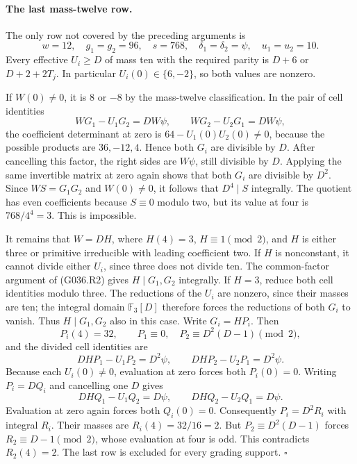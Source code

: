 \paragraph{The last mass-twelve row.}
The only row not covered by the preceding arguments is
\[
 w=12,\quad g_1=g_2=96,\quad s=768,\quad
 \delta_1=\delta_2=\psi,\quad u_1=u_2=10.
\]
Every effective $U_i\ge D$ of mass ten with the required
parity is $D+6$ or $D+2+2T_j$. In particular
$U_i(0)\in\{6,-2\}$, so both values are nonzero.

If $W(0)\ne0$, it is $8$ or $-8$ by the mass-twelve
classification. In the pair of cell identities
\[
 WG_1-U_1G_2=DW\psi,\qquad
 WG_2-U_2G_1=DW\psi,
\]
the coefficient determinant at zero is
$64-U_1(0)U_2(0)\ne0$, because the possible products
are $36,-12,4$. Hence both $G_i$ are divisible by $D$.
After cancelling this factor, the right sides are
$W\psi$, still divisible by $D$.
Applying the same invertible matrix at zero again
shows that both $G_i$ are divisible by $D^2$.
Since $WS=G_1G_2$ and $W(0)\ne0$, it follows that
$D^4\mid S$ integrally.
The quotient has even coefficients because $S\equiv0$
modulo two, but its value at four is
$768/4^4=3$. This is impossible.

It remains that $W=DH$, where $H(4)=3$,
$H\equiv1\pmod2$, and $H$ is either three
or primitive irreducible with leading coefficient two.
If $H$ is nonconstant, it cannot divide either
$U_i$, since three does not divide ten.
The common-factor argument of (G036.R2) gives
$H\mid G_1,G_2$ integrally.
If $H=3$, reduce both cell identities modulo three.
The reductions of the $U_i$ are nonzero, since their
masses are ten; the integral domain $\mathbb F_3[D]$
therefore forces the reductions of both $G_i$ to
vanish. Thus $H\mid G_1,G_2$ also in this case.
Write $G_i=HP_i$. Then
\[
 P_i(4)=32,\qquad
 P_1\equiv0,\quad P_2\equiv D^2(D-1)\pmod2,
\]
and the divided cell identities are
\[
 DH P_1-U_1P_2=D^2\psi,\qquad
 DH P_2-U_2P_1=D^2\psi.
\]
Because each $U_i(0)\ne0$, evaluation at zero
forces both $P_i(0)=0$.
Writing $P_i=DQ_i$ and cancelling one $D$ gives
\[
 DH Q_1-U_1Q_2=D\psi,\qquad
 DH Q_2-U_2Q_1=D\psi.
\]
Evaluation at zero again forces both $Q_i(0)=0$.
Consequently $P_i=D^2R_i$ with integral $R_i$.
Their masses are $R_i(4)=32/16=2$.
But $P_2\equiv D^2(D-1)$ forces
$R_2\equiv D-1\pmod2$, whose evaluation at four
is odd. This contradicts $R_2(4)=2$.
The last row is excluded for every grading support.
\hfill$\square$

